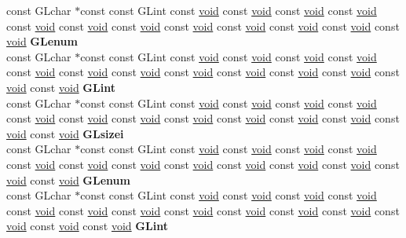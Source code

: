 \begin{DoxyCompactItemize}
\begin{tabbing}
\>const GLchar $\ast$const const GLint const \hyperlink{interfacevoid}{void} const \hyperlink{interfacevoid}{void} const \hyperlink{interfacevoid}{void} const \hyperlink{interfacevoid}{void} const \hyperlink{interfacevoid}{void} const \hyperlink{interfacevoid}{void} const \hyperlink{interfacevoid}{void} const \hyperlink{interfacevoid}{void} const \hyperlink{interfacevoid}{void} const \hyperlink{interfacevoid}{void} const \hyperlink{interfacevoid}{void} const \hyperlink{interfacevoid}{void} {\bfseries GLenum}\\
\>const GLchar $\ast$const const GLint const \hyperlink{interfacevoid}{void} const \hyperlink{interfacevoid}{void} const \hyperlink{interfacevoid}{void} const \hyperlink{interfacevoid}{void} const \hyperlink{interfacevoid}{void} const \hyperlink{interfacevoid}{void} const \hyperlink{interfacevoid}{void} const \hyperlink{interfacevoid}{void} const \hyperlink{interfacevoid}{void} const \hyperlink{interfacevoid}{void} const \hyperlink{interfacevoid}{void} const \hyperlink{interfacevoid}{void} const \hyperlink{interfacevoid}{void} {\bfseries GLint}\\
\>const GLchar $\ast$const const GLint const \hyperlink{interfacevoid}{void} const \hyperlink{interfacevoid}{void} const \hyperlink{interfacevoid}{void} const \hyperlink{interfacevoid}{void} const \hyperlink{interfacevoid}{void} const \hyperlink{interfacevoid}{void} const \hyperlink{interfacevoid}{void} const \hyperlink{interfacevoid}{void} const \hyperlink{interfacevoid}{void} const \hyperlink{interfacevoid}{void} const \hyperlink{interfacevoid}{void} const \hyperlink{interfacevoid}{void} const \hyperlink{interfacevoid}{void} {\bfseries GLsizei}\\
\>const GLchar $\ast$const const GLint const \hyperlink{interfacevoid}{void} const \hyperlink{interfacevoid}{void} const \hyperlink{interfacevoid}{void} const \hyperlink{interfacevoid}{void} const \hyperlink{interfacevoid}{void} const \hyperlink{interfacevoid}{void} const \hyperlink{interfacevoid}{void} const \hyperlink{interfacevoid}{void} const \hyperlink{interfacevoid}{void} const \hyperlink{interfacevoid}{void} const \hyperlink{interfacevoid}{void} const \hyperlink{interfacevoid}{void} const \hyperlink{interfacevoid}{void} {\bfseries GLenum}\\
\>const GLchar $\ast$const const GLint const \hyperlink{interfacevoid}{void} const \hyperlink{interfacevoid}{void} const \hyperlink{interfacevoid}{void} const \hyperlink{interfacevoid}{void} const \hyperlink{interfacevoid}{void} const \hyperlink{interfacevoid}{void} const \hyperlink{interfacevoid}{void} const \hyperlink{interfacevoid}{void} const \hyperlink{interfacevoid}{void} const \hyperlink{interfacevoid}{void} const \hyperlink{interfacevoid}{void} const \hyperlink{interfacevoid}{void} const \hyperlink{interfacevoid}{void} const \hyperlink{interfacevoid}{void} {\bfseries GLint}\\

\end{tabbing}
\end{DoxyCompactItemize}
